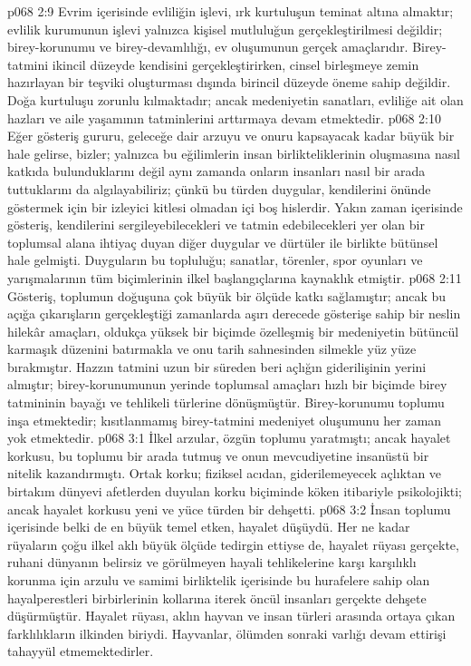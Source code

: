 \vs p068 2:9 Evrim içerisinde evliliğin işlevi, ırk kurtuluşun teminat altına almaktır; evlilik kurumunun işlevi yalnızca kişisel mutluluğun gerçekleştirilmesi değildir; birey\hyp{}korunumu ve birey\hyp{}devamlılığı, ev oluşumunun gerçek amaçlarıdır. Birey\hyp{}tatmini ikincil düzeyde kendisini gerçekleştirirken, cinsel birleşmeye zemin hazırlayan bir teşviki oluşturması dışında birincil düzeyde öneme sahip değildir. Doğa kurtuluşu zorunlu kılmaktadır; ancak medeniyetin sanatları, evliliğe ait olan hazları ve aile yaşamının tatminlerini arttırmaya devam etmektedir.
\vs p068 2:10 Eğer gösteriş gururu, geleceğe dair arzuyu ve onuru kapsayacak kadar büyük bir hale gelirse, bizler; yalnızca bu eğilimlerin insan birlikteliklerinin oluşmasına nasıl katkıda bulunduklarını değil aynı zamanda onların insanları nasıl bir arada tuttuklarını da algılayabiliriz; çünkü bu türden duygular, kendilerini önünde göstermek için bir izleyici kitlesi olmadan içi boş hislerdir. Yakın zaman içerisinde gösteriş, kendilerini sergileyebilecekleri ve tatmin edebilecekleri yer olan bir toplumsal alana ihtiyaç duyan diğer duygular ve dürtüler ile birlikte bütünsel hale gelmişti. Duyguların bu topluluğu; sanatlar, törenler, spor oyunları ve yarışmalarının tüm biçimlerinin ilkel başlangıçlarına kaynaklık etmiştir.
\vs p068 2:11 Gösteriş, toplumun doğuşuna çok büyük bir ölçüde katkı sağlamıştır; ancak bu açığa çıkarışların gerçekleştiği zamanlarda aşırı derecede gösterişe sahip bir neslin hilekâr amaçları, oldukça yüksek bir biçimde özelleşmiş bir medeniyetin bütüncül karmaşık düzenini batırmakla ve onu tarih sahnesinden silmekle yüz yüze bırakmıştır. Hazzın tatmini uzun bir süreden beri açlığın giderilişinin yerini almıştır; birey\hyp{}korunumunun yerinde toplumsal amaçları hızlı bir biçimde birey tatmininin bayağı ve tehlikeli türlerine dönüşmüştür. Birey\hyp{}korunumu toplumu inşa etmektedir; kısıtlanmamış birey\hyp{}tatmini medeniyet oluşumunu her zaman yok etmektedir.
\vs p068 3:1 İlkel arzular, özgün toplumu yaratmıştı; ancak hayalet korkusu, bu toplumu bir arada tutmuş ve onun mevcudiyetine insanüstü bir nitelik kazandırmıştı. Ortak korku; fiziksel acıdan, giderilemeyecek açlıktan ve birtakım dünyevi afetlerden duyulan korku biçiminde köken itibariyle psikolojikti; ancak hayalet korkusu yeni ve yüce türden bir dehşetti.
\vs p068 3:2 İnsan toplumu içerisinde belki de en büyük temel etken, hayalet düşüydü. Her ne kadar rüyaların çoğu ilkel aklı büyük ölçüde tedirgin ettiyse de, hayalet rüyası gerçekte, ruhani dünyanın belirsiz ve görülmeyen hayali tehlikelerine karşı karşılıklı korunma için arzulu ve samimi birliktelik içerisinde bu hurafelere sahip olan hayalperestleri birbirlerinin kollarına iterek öncül insanları gerçekte dehşete düşürmüştür. Hayalet rüyası, aklın hayvan ve insan türleri arasında ortaya çıkan farklılıkların ilkinden biriydi. Hayvanlar, ölümden sonraki varlığı devam ettirişi tahayyül etmemektedirler.
